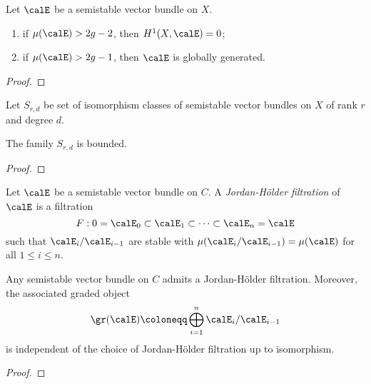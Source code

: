     \begin{lemma}\label{lem:vanishing_and_global_generation_of_semistable_vector_bundles}
        Let \(\calE\) be a semistable vector bundle on \(X\).
        \begin{enumerate}
            \item if \(\mu(\calE) > 2g-2\), then \(H^1(X,\calE) = 0\);
            \item if \(\mu(\calE) > 2g-1\), then \(\calE\) is globally generated.
        \end{enumerate}
    \end{lemma}
    \begin{proof}
    \end{proof}

    Let \(S_{r,d}\) be set of isomorphism classes of semistable vector bundles on \(X\) of rank \(r\) and degree \(d\).

    \begin{proposition}\label{prop:semistable_vector_bundles_are_bounded}
        The family \(S_{r,d}\) is bounded.
    \end{proposition}
    \begin{proof}
    \end{proof}


    \begin{definition}\label{def:Jordan-Holder_filtration}
        Let \(\calE\) be a semistable vector bundle on \(C\).
        A \emph{Jordan-H\"older filtration} of \(\calE\) is a filtration 
        \[ F : 0 = \calE_0 \subset \calE_1 \subset \cdots \subset \calE_n = \calE \]
        such that \(\calE_i/\calE_{i-1}\) are stable with \(\mu(\calE_i/\calE_{i-1}) = \mu(\calE)\) for all \(1 \leq i \leq n\).
    \end{definition}

    \begin{proposition}\label{prop:existence_and_uniqueness_of_Jordan-Holder_filtration}
        Any semistable vector bundle on \(C\) admits a Jordan-H\"older filtration.
        Moreover, the associated graded object 
        \[ \gr(\calE) \coloneqq \bigoplus_{i=1}^n \calE_i/\calE_{i-1} \]
        is independent of the choice of Jordan-H\"older filtration up to isomorphism.
    \end{proposition}
    \begin{proof}
    \end{proof}

